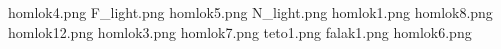 homlok4.png
F_light.png
homlok5.png
N_light.png
homlok1.png
homlok8.png
homlok12.png
homlok3.png
homlok7.png
teto1.png
falak1.png
homlok6.png
